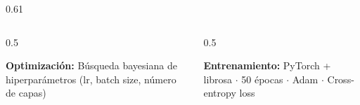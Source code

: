 \documentclass[final]{beamer}
\begin{document}
\begin{frame}[t]{}
\begin{columns}[t,totalwidth=\linewidth]
\begin{column}{0.61\linewidth}
\begin{tcolorbox}[sectionbox, title={$\bigstar$ Arquitectura CNN 2-D}]
\vspace{4pt}
\begin{columns}[t]
  \begin{column}{0.5\linewidth}
    \begin{tcolorbox}[archbox]
    \textbf{Optimizaci\'on:} B\'usqueda bayesiana de hiperpar\'ametros
    (lr, batch size, n\'umero de capas)
    \end{tcolorbox}
  \end{column}
  \begin{column}{0.5\linewidth}
    \begin{tcolorbox}[archbox]
    \textbf{Entrenamiento:} PyTorch + librosa $\cdot$ 50 \'epocas $\cdot$
    Adam $\cdot$ Cross-entropy loss
    \end{tcolorbox}
  \end{column}
\end{columns}
\end{tcolorbox}

\end{column}
\end{columns}

\vspace{6pt}


\end{frame}
\end{document}
